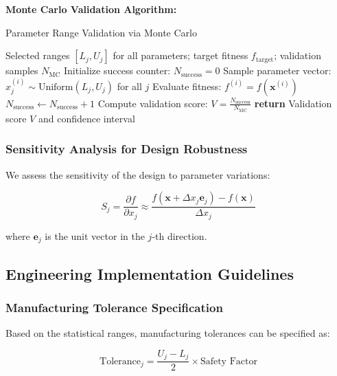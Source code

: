 \documentclass[12pt,a4paper]{article}
\begin{document}
\textbf{Monte Carlo Validation Algorithm:}
\begin{algorithm}[H]
\caption{Parameter Range Validation via Monte Carlo}
\begin{algorithmic}[1]
\REQUIRE Selected ranges $[L_j, U_j]$ for all parameters; target fitness $f_{\text{target}}$; validation samples $N_{\text{MC}}$
\STATE Initialize success counter: $N_{\text{success}} = 0$
    \STATE Sample parameter vector: $x_j^{(i)} \sim \text{Uniform}(L_j, U_j)$ for all $j$
    \STATE Evaluate fitness: $f^{(i)} = f(\mathbf{x}^{(i)})$
        \STATE $N_{\text{success}} \leftarrow N_{\text{success}} + 1$
    \ENDIF
\ENDFOR
\STATE Compute validation score: $V = \frac{N_{\text{success}}}{N_{\text{MC}}}$
\STATE \textbf{return} Validation score $V$ and confidence interval
\end{algorithmic}
\end{algorithm}

\subsubsection{Sensitivity Analysis for Design Robustness}

We assess the sensitivity of the design to parameter variations:

\begin{equation}
S_j = \frac{\partial f}{\partial x_j} \approx \frac{f(\mathbf{x} + \Delta x_j \mathbf{e}_j) - f(\mathbf{x})}{\Delta x_j}
\end{equation}

where $\mathbf{e}_j$ is the unit vector in the $j$-th direction.

\subsection{Engineering Implementation Guidelines}

\subsubsection{Manufacturing Tolerance Specification}

Based on the statistical ranges, manufacturing tolerances can be specified as:

\begin{equation}
\text{Tolerance}_j = \frac{U_j - L_j}{2} \times \text{Safety Factor}
\end{equation}
\end{document}
